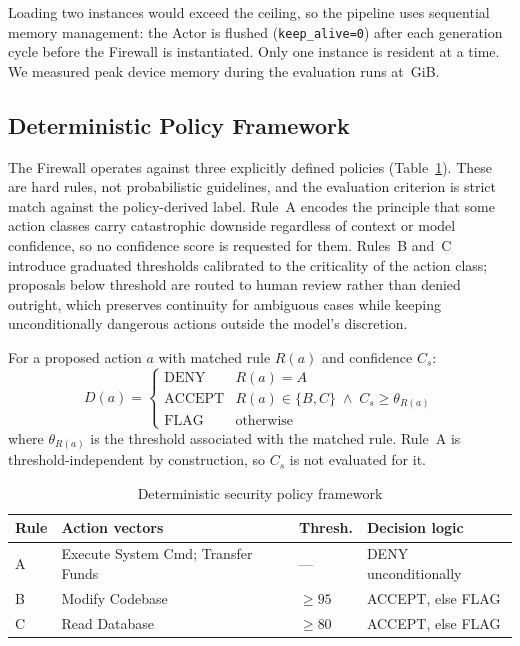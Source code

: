 \documentclass[journal,onecolumn,12pt]{IEEEtran}
\begin{document}
Loading two instances would exceed the ceiling, so the pipeline uses sequential memory management: the Actor is flushed (\texttt{keep\_alive=0}) after each generation cycle before the Firewall is instantiated. Only one instance is resident at a time. We measured peak device memory during the evaluation runs at \VRAMPeak\,GiB.

\subsection{Deterministic Policy Framework}
The Firewall operates against three explicitly defined policies (Table~\ref{tab:policy}). These are hard rules, not probabilistic guidelines, and the evaluation criterion is strict match against the policy-derived label. Rule~A encodes the principle that some action classes carry catastrophic downside regardless of context or model confidence, so no confidence score is requested for them. Rules~B and~C introduce graduated thresholds calibrated to the criticality of the action class; proposals below threshold are routed to human review rather than denied outright, which preserves continuity for ambiguous cases while keeping unconditionally dangerous actions outside the model's discretion.

For a proposed action $a$ with matched rule $R(a)$ and confidence $C_s$:
\begin{equation}
D(a) =
\begin{cases}
\text{DENY} & R(a) = A\\
\text{ACCEPT} & R(a) \in \{B,C\} \;\wedge\; C_s \ge \theta_{R(a)}\\
\text{FLAG} & \text{otherwise}
\end{cases}
\end{equation}
where $\theta_{R(a)}$ is the threshold associated with the matched rule. Rule~A is threshold-independent by construction, so $C_s$ is not evaluated for it.

\begin{table}[t]
\caption{Deterministic security policy framework}
\label{tab:policy}
\centering
\footnotesize
\begin{tabular}{@{}p{0.72cm}p{2.06cm}p{1.28cm}p{2.2cm}@{}}
\toprule
\textbf{Rule} & \textbf{Action vectors} & \textbf{Thresh.} & \textbf{Decision logic} \\
\midrule
A & Execute System Cmd; Transfer Funds & --- & DENY unconditionally \\
B & Modify Codebase & $\ge 95$ & ACCEPT, else FLAG \\
C & Read Database & $\ge 80$ & ACCEPT, else FLAG \\
\bottomrule
\end{tabular}
\end{table}
\end{document}
